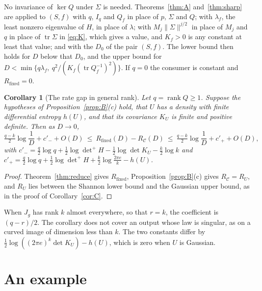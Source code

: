 \documentclass[11pt,onecolumn]{IEEEtran}
\newtheorem{corollary}[theorem]{Corollary}
\newcommand{\tr}{\operatorname{tr}}
\newcommand{\Rfix}{R_{\mathrm{fixed}}}
\newcommand{\RC}{R_{\mathcal C}}
\begin{document}
No invariance of $\ker Q$ under $\Sigma$ is needed. Theorems~\ref{thm:A}
and~\ref{thm:sharp} are applied to $(S,f)$ with $q$, $I_q$ and $Q_f$ in place of $p$,
$\Sigma$ and $Q$; with $\lambda_f$, the least nonzero eigenvalue of $H$, in place of
$\lambda$; with $M_j\|\Sigma\|^{j/2}$ in place of $M_j$ and $q$ in place of $\tr\Sigma$ in
\eqref{eq:K}, which gives a value, and $K_f>0$ is any constant at least that value; and
with the $D_0$ of the pair $(S,f)$. The lower bound
then holds for $D$ below that $D_0$, and the upper bound for
$D<\min\{q\lambda_f,\ q^2/(K_f(\tr Q_f^{-1})^2)\}$. If $q=0$ the consumer is constant
and $\Rfix=0$.

\begin{corollary}[The rate gap in general rank]\label{cor:gapq}
Let $q=\operatorname{rank}Q\ge1$. Suppose the hypotheses of
Proposition~\ref{prop:B}(c) hold, that $U$ has a density with finite differential entropy
$h(U)$, and that its covariance $K_U$ is finite and positive definite. Then as $D\to0$,
\[
\tfrac{q-k}2\log\frac1D+c'_-+O(D)\ \le\ \Rfix(D)-\RC(D)\ \le\
\tfrac{q-k}2\log\frac1D+c'_++O(D),
\]
with $c'_-=\tfrac q2\log q+\tfrac12\log{\det}^{+}H-\tfrac12\log\det K_U-\tfrac k2\log k$
and $c'_+=\tfrac q2\log q+\tfrac12\log{\det}^{+}H+\tfrac k2\log\tfrac{2\pi e}k-h(U)$.
\end{corollary}

\begin{proof}
Theorem~\ref{thm:reduce} gives $\Rfix$, Proposition~\ref{prop:B}(c) gives $\RC=R_U$, and
$R_U$ lies between the Shannon lower bound and the Gaussian upper bound, as in the proof
of Corollary~\ref{cor:C}.
\end{proof}

When $J_g$ has rank $k$ almost everywhere, so that $r=k$, the coefficient is $(q-r)/2$.
The corollary does not cover an output whose law is singular, as on a curved image of
dimension less than $k$. The two constants differ by
$\tfrac12\log((2\pi e)^k\det K_U)-h(U)$, which is zero when $U$ is Gaussian.

\section{An example}\label{sec:example}
\end{document}
